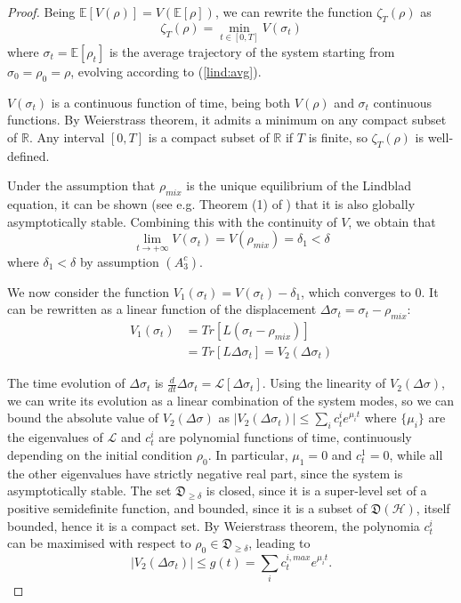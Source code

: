 \documentclass[conference]{IEEEtran}
\theoremstyle{plain}
\theoremstyle{plain}
\theoremstyle{plain}
\theoremstyle{plain}
\theoremstyle{remark}
\theoremstyle{definition}
\begin{document}
\begin{proof}
    Being $\mathbb E[V(\rho)] = V(\mathbb E[\rho])$, we can rewrite the function $\zeta_T(\rho)$ as \begin{equation}
        \zeta_T(\rho) = \min_{t \in [0, T]}V(\sigma_t)
    \end{equation}
    where $\sigma_t = \mathbb E[\rho_t]$ is the average trajectory of the system starting from $\sigma_0 = \rho_0 = \rho$, evolving according to (\ref{lind:avg}).

    $V(\sigma_t)$ is a continuous function of time, being both $V(\rho)$ and $\sigma_t$ continuous functions. By Weierstrass theorem, it admits a minimum on any compact subset of $\mathbb R$. Any interval $[0, T]$ is a compact subset of $\mathbb R$ if $T$ is finite, so $\zeta_T(\rho)$ is well-defined.

    Under the assumption that $\rho_{mix}$ is the unique equilibrium of the Lindblad equation, it can be shown (see e.g. Theorem (1) of \cite{uniqueness}) that it is also globally asymptotically stable. Combining this with the continuity of $V$, we obtain that \begin{equation}
        \lim_{t \rightarrow +\infty} V(\sigma_t) = V(\rho_{mix}) = \delta_1 < \delta
    \end{equation}
    where $\delta_1 < \delta$ by assumption $(A^c_3)$.

    We now consider the function $V_1(\sigma_t) = V(\sigma_t) - \delta_1$, which converges to $0$. It can be rewritten as a linear function of the displacement $\Delta \sigma_t = \sigma_t - \rho_{mix}$: \begin{align}
        V_1(\sigma_t) &= Tr[L(\sigma_t - \rho_{mix})] \nonumber \\ &= Tr[L\Delta \sigma_t] = V_2(\Delta \sigma_t) \label{linearv}
    \end{align}

    The time evolution of $\Delta \sigma_t$ is $\frac{d}{dt}\Delta \sigma_t = \mathscr L[\Delta\sigma_t]$. Using the linearity of $V_2(\Delta \sigma)$, we can write its evolution as a linear combination of the system modes, so we can bound the absolute value of $V_2(\Delta \sigma)$ as 
    \(
        |V_2(\Delta \sigma_t)| \le \sum_i c_t^i e^{\mu_i t} \)
    where $\{\mu_i\}$ are the eigenvalues of $\mathscr L$ and $c^i_t$ are polynomial functions of time, continuously depending on the initial condition $\rho_0$. In particular, $\mu_1 = 0$ and $c^1_t = 0$, while all the other eigenvalues have strictly negative real part, since the system is asymptotically stable. The set $\mathfrak D_{\ge \delta}$ is closed, since it is a super-level set of a positive semidefinite function, and bounded, since it is a subset of $\mathfrak D(\mathcal H)$, itself bounded, hence it is a compact set. By Weierstrass theorem, the polynomia $c_t^i$ can be maximised with respect to $\rho_0 \in \mathfrak D_{\ge \delta}$, leading to \begin{equation}
        |V_2(\Delta \sigma_t)| \le g(t) = \sum_i c_t^{i, max}e^{\mu_it}. \label{boundV2}
    \end{equation}
    

\end{proof}
\end{document}
